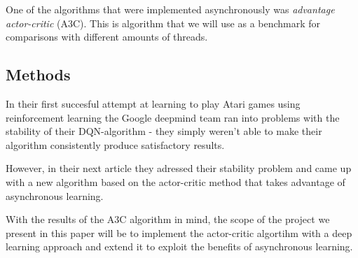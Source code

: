 \documentclass[11pt]{article}
\begin{document}
One of the algorithms that were implemented asynchronously
was \textit{advantage actor-critic} (A3C).
This is algorithm that we will use as a benchmark for
comparisons with different amounts of threads.

\subsection{Methods}

In their first succesful attempt at learning to play Atari games using
reinforcement learning the Google deepmind team ran into problems with
the stability of their DQN-algorithm\cite{dqn} - they simply weren't able
to make their algorithm consistently produce satisfactory results.

However, in their next article they adressed their stability problem
and came up with a new algorithm based on the actor-critic method
that takes advantage of asynchronous learning.

With the results of the A3C algorithm in mind\cite{a3c}, the scope of the project we present in
this paper will be to implement the actor-critic algortihm\cite{RLbook}
with a deep learning approach and extend it to exploit the benefits
of asynchronous learning.




%
%
\end{document}
